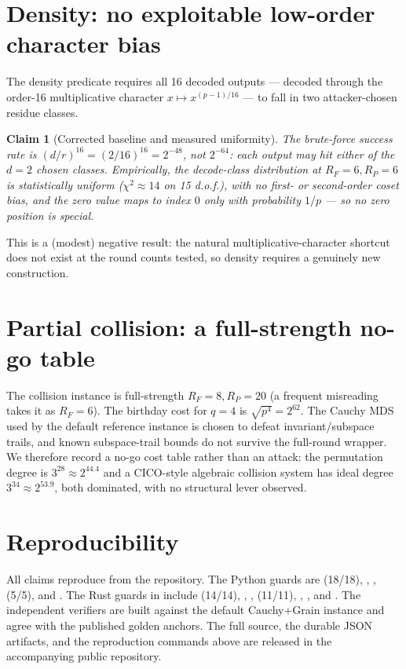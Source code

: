 \documentclass[11pt]{article}
\newcommand{\RF}{R_F}
\newcommand{\RP}{R_P}
\newcommand{\Verified}[1]{}
\newcommand{\Verified}[1]{\marginpar{\footnotesize\textcolor{blue}{[V: #1]}}}
\theoremstyle{plain}
\newtheorem{claim}{Claim}
\begin{document}
\section{Density: no exploitable low-order character bias}\label{sec:density}
The density predicate requires all 16 decoded outputs --- decoded through the
order-16 multiplicative character $x\mapsto x^{(p-1)/16}$ --- to fall in two
attacker-chosen residue classes.

\begin{claim}[Corrected baseline and measured uniformity]
The brute-force success rate is $(d/r)^{16} = (2/16)^{16} = 2^{-48}$, not $2^{-64}$:
each output may hit \emph{either} of the $d=2$ chosen classes. Empirically, the
decode-class distribution at $\RF=6,\RP=6$ is statistically uniform
($\chi^2 \approx 14$ on 15 d.o.f.), with no first- or second-order coset bias, and
the zero \emph{value} maps to index $0$ only with probability $1/p$ --- so no zero
position is special. \Verified{profile\_density\_decode}
\end{claim}

This is a (modest) negative result: the natural multiplicative-character shortcut
does not exist at the round counts tested, so density requires a genuinely new
construction.

\section{Partial collision: a full-strength no-go table}\label{sec:collision}
The collision instance is full-strength $\RF=8,\RP=20$ (a frequent misreading takes
it as $\RF=6$). The birthday cost for $q=4$ is $\sqrt{p^4}=2^{62}$. The Cauchy MDS used
by the default reference instance is chosen to defeat invariant/subspace trails, and
known subspace-trail bounds do not
survive the full-round wrapper. We therefore record a no-go cost table rather than an
attack: the permutation degree is $3^{28}\approx 2^{44.4}$ and a CICO-style algebraic
collision system has ideal degree $3^{34}\approx 2^{53.9}$, both dominated, with no
structural lever observed. \Verified{partial\_collision\_verifier; constants.py}

\section{Reproducibility}\label{sec:repro}
All claims reproduce from the repository. The Python guards are
 (18/18), ,
,  (5/5), and
. The Rust guards in  include
 (14/14), , ,
 (11/11), ,
, and . The independent
verifiers are built against the default Cauchy+Grain instance and agree with the
published golden anchors. The full source, the durable JSON artifacts, and the
reproduction commands above are released in the accompanying public repository.
\end{document}
